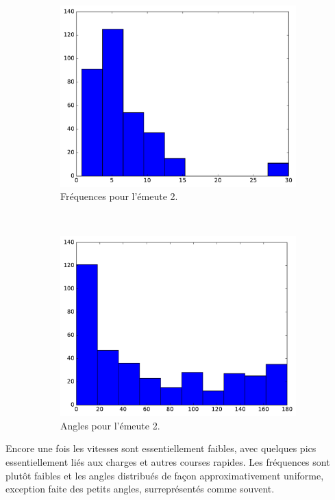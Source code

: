 \begin{figure}[htb]
\begin{subfigure}[t]{\subImgWaStats}
			\includegraphics[width=\textwidth]{figures/ch3/riot2a_frequency}
			\caption{Fréquences pour l'émeute 2.}
			\label{fig:riot2a_frequency}
		\end{subfigure}
		~
		\begin{subfigure}[t]{\subImgWaStats}
			\centering
			\includegraphics[width=\textwidth]{figures/ch3/riot2a_angle}
			\caption{Angles pour l'émeute 2.}
			\label{fig:riot2a_angle}
		\end{subfigure}
		\caption[Histogrammes, émeutes]{}
		\label{fig:histRiots}
	\end{figure}

	Encore une fois les vitesses sont essentiellement faibles, avec quelques pics essentiellement liés aux charges et autres courses rapides. Les fréquences sont plutôt faibles et les angles distribués de façon approximativement uniforme, exception faite des petits angles, surreprésentés comme souvent.
	
